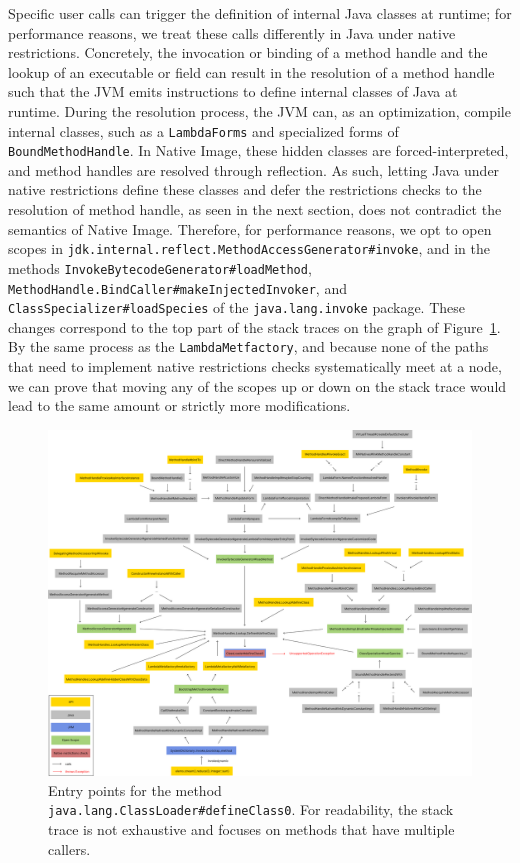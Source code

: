 Specific user calls can trigger the definition of internal Java classes at runtime; for performance reasons, we treat these calls differently in Java under native restrictions.
Concretely, the invocation or binding of a method handle and the lookup of an executable or field can result in the resolution of a method handle such that the JVM emits instructions to define internal classes of Java at runtime. During the resolution process, the JVM can, as an optimization, compile internal classes, such as a \verb|LambdaForms| and specialized forms of \verb|BoundMethodHandle|.
In Native Image, these hidden classes are forced-interpreted, and method handles are resolved through reflection. As such, letting Java under native restrictions define these classes and defer the restrictions checks to the resolution of method handle, as seen in the next section, does not contradict the semantics of Native Image. Therefore, for performance reasons, we opt to open scopes in \verb|jdk.internal.reflect.MethodAccessGenerator#invoke|, and in the methods \verb|InvokeBytecodeGenerator#loadMethod|, \verb|MethodHandle.BindCaller#makeInjectedInvoker|, and \verb|ClassSpecializer#loadSpecies| of the \verb|java.lang.invoke| package. These changes correspond to the top part of the stack traces on the graph of Figure~\ref{fig:define_class_0}. By the same process as the \verb|LambdaMetfactory|, and because none of the paths that need to implement native restrictions checks systematically meet at a node, we can prove that moving any of the scopes up or down on the stack trace would lead to the same amount or strictly more modifications.

\begin{figure}
    \centering
    \includegraphics[angle=90,origin=c,scale=0.35]{resources/Group 413.png}
    \caption{Entry points for the method \texttt{java.lang.ClassLoader\#defineClass0}. For readability, the stack trace is not exhaustive and focuses on methods that have multiple callers.}
    \label{fig:define_class_0}
\end{figure}

